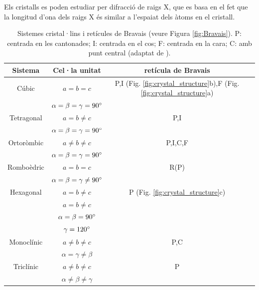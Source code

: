 Els cristalls es poden estudiar per difracció de raigs X, que es basa en el fet que la longitud d'ona dels raigs X és similar a l'espaiat dels àtoms en el cristall. 

\begin{table}[h!]
  \begin{center}
    \caption[Sistemes cristal·lins i retícules de Bravais]{Sistemes cristal·lins i retícules de Bravais (veure Figura \ref{fig:Bravais}). P: centrada en les cantonades; I: centrada en el cos; F: centrada en la cara; C: amb punt central (adaptat de \cite{Yen2008}).}
    \label{tab:Bravais}
    \begin{tabular}{cccc}
      \hline
      Sistema & Cel·la unitat & retícula de Bravais \\ 
      \hline
	  Cúbic      & $a=b=c$ & P,I (Fig. \ref{fig:crystal_structure}b),F (Fig. \ref{fig:crystal_structure}a)\\
	             & $\alpha=\beta=\gamma=90\degree$ & \\
	  Tetragonal & $a=b\neq c$ & P,I \\
	             & $\alpha=\beta=\gamma=90\degree$ & \\
	  Ortoròmbic & $a\neq b\neq c$ & P,I,C,F\\
	             & $\alpha=\beta=\gamma=90\degree$ & \\
	  Romboèdric & $a=b=c$ & R(P)\\
	             & $\alpha=\beta=\gamma \neq 90\degree$ & \\
	  Hexagonal  & $a=b\neq c$ & P (Fig. \ref{fig:crystal_structure}c) \\
	             & $a=b \neq c$ & \\
	             & $\alpha = \beta = 90 \degree$ & \\
	             & $\gamma = 120\degree$ &\\
	  Monoclínic & $a \neq b \neq c$ & P,C\\
	             & $\alpha=\gamma \neq \beta$&\\
	  Triclínic  & $a \neq b \neq c$ & P\\
	             & $\alpha \neq \beta \neq \gamma$&\\
      \hline
    \end{tabular}
  \end{center}
\end{table}


